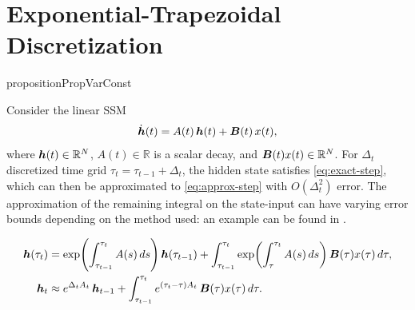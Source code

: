 \section{Exponential-Trapezoidal Discretization}
\begin{restatable}{proposition}{PropVarConst}\label{prop:var-const}

Consider the linear SSM
\begin{equation*}
    \dot{{\bm{h}}}(t) = A(t)\,{\bm{h}}(t) + {\bm{B}}(t)\,x(t),
\end{equation*}
where ${\bm{h}}(t)\in\mathbb{R}^N$, $A(t)\in\mathbb{R}$ is a scalar decay, and ${\bm{B}}(t)x(t)\in\mathbb{R}^N$.  
For $\Delta_t$ discretized time grid $\tau_t = \tau_{t-1} + \Delta_t$, the hidden state satisfies \eqref{eq:exact-step}, which can then be approximated to \eqref{eq:approx-step} with $O(\Delta_t^2)$ error.
The approximation of the remaining integral on the state-input can have varying error bounds depending on the method used: an example can be found in .

\begin{align}
\label{eq:exact-step}
{\bm{h}}(\tau_t)
&= \exp\!\left(\int_{\tau_{t-1}}^{\tau_t} A(s)\,ds\right){\bm{h}}(\tau_{t-1})
 + \int_{\tau_{t-1}}^{\tau_t}
   \exp\!\left(\int_{\tau}^{\tau_t} A(s)\,ds\right){\bm{B}}(\tau)x(\tau)\, d\tau, \\
\label{eq:approx-step}
{\bm{h}}_t
&\approx e^{\Delta_t A_t}\,{\bm{h}}_{t-1}
 + \int_{\tau_{t-1}}^{\tau_t} e^{(\tau_t-\tau)A_t}\,{\bm{B}}(\tau)x(\tau)\,d\tau .
\end{align}


\end{restatable}
